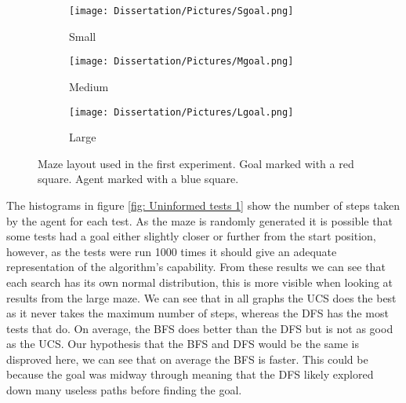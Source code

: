 \documentclass[]{final_report}
\begin{document}
\begin{figure}[htp!]
\captionsetup[subfigure]{format=suboverlay}
\newcommand{\subcaptionOverlay}[1]{%
  \subcaption{}%
  \begin{tikzpicture}
    \node [inner sep=0,anchor=north west]at (-10ex,3ex) (image) {#1};
    \draw node [black] {\subcapoverlay};
  \end{tikzpicture}%
}
     \centering
     \begin{subfigure}[h]{0.3\textwidth}
         \centering
         \texttt{[image: Dissertation/Pictures/Sgoal.png]}
         \caption*{Small}
     \end{subfigure}
     \hfill
     \begin{subfigure}[h]{0.3\textwidth}
         \centering
         \texttt{[image: Dissertation/Pictures/Mgoal.png]}
         \caption*{Medium}
     \end{subfigure}
     \hfill
     \begin{subfigure}[h]{0.3\textwidth}
         \centering
         \texttt{[image: Dissertation/Pictures/Lgoal.png]}
         \caption*{Large}
     \end{subfigure}
     \captionsetup{justification=centering}
     \caption{Maze layout used in the first experiment. Goal marked with a red square. Agent marked with a blue square.}
     \label{fig: three graphs}
\end{figure}

The histograms in figure \ref{fig: Uninformed tests 1} show the number of steps taken by the agent for each test. As the maze is randomly generated it is possible that some tests had a goal either slightly closer or further from the start position, however, as the tests were run 1000 times it should give an adequate representation of the algorithm's capability. From these results we can see that each search has its own normal distribution, this is more visible when looking at results from the large maze. We can see that in all graphs the UCS does the best as it never takes the maximum number of steps, whereas the DFS has the most tests that do. On average, the BFS does better than the DFS but is not as good as the UCS. Our hypothesis that the BFS and DFS would be the same is disproved here, we can see that on average the BFS is faster. This could be because the goal was midway through meaning that the DFS likely explored down many useless paths before finding the goal.
\newpage
\end{document}
